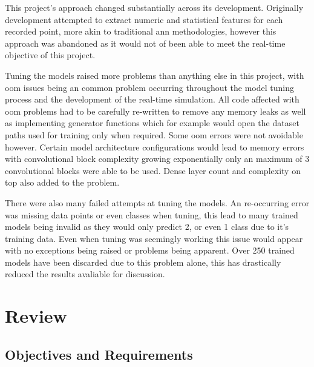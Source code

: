 \documentclass[12pt]{article}
\begin{document}
This project's approach changed substantially across its development. Originally development attempted to extract numeric and statistical features for each recorded point, more akin to traditional \acrshort{ann} methodologies, however this approach was abandoned as it would not of been able to meet the real-time objective of this project. 

Tuning the models raised more problems than anything else in this project, with \acrshort{oom} issues being an common problem occurring throughout the model tuning process and the development of the real-time simulation. All code affected with \acrshort{oom} problems had to be carefully re-written to remove any memory leaks as well as implementing generator functions which for example would open the dataset paths used for training only when required. Some \acrshort{oom} errors were not avoidable however. Certain model architecture configurations would lead to memory errors with convolutional block complexity growing exponentially only an maximum of 3 convolutional blocks were able to be used. Dense layer count and complexity on top also added to the problem. 

There were also many failed attempts at tuning the models. An re-occurring error was missing data points or even classes when tuning, this lead to many trained models being invalid as they would only predict 2, or even 1 class due to it's training data. Even when tuning was seemingly working this issue would appear with no exceptions being raised or problems being apparent. Over 250 trained models have been discarded due to this problem alone, this has drastically reduced the results avaliable for discussion. 


\section{Review}

\subsection{Objectives and Requirements}
\end{document}
